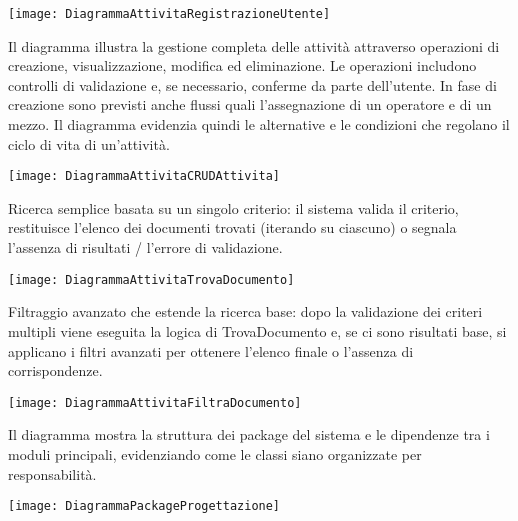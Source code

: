 \documentclass[a4paper]{report}
\begin{document}
\begin{figure*}[!ht]
    \centering
    \texttt{[image: DiagrammaAttivitaRegistrazioneUtente]}
\end{figure*}

\clearpage
{}
Il diagramma illustra la gestione completa delle attività attraverso operazioni di creazione, visualizzazione, modifica ed eliminazione. Le operazioni includono controlli di validazione e, se necessario, conferme da parte dell’utente. In fase di creazione sono previsti anche flussi quali l’assegnazione di un operatore e di un mezzo. Il diagramma evidenzia quindi le alternative e le condizioni che regolano il ciclo di vita di un’attività.

\begin{figure*}[!ht]
    \centering
    \texttt{[image: DiagrammaAttivitaCRUDAttivita]}
\end{figure*}

\clearpage
{}
Ricerca semplice basata su un singolo criterio: il sistema valida il criterio, restituisce l’elenco dei documenti trovati (iterando su ciascuno) o segnala l’assenza di risultati / l’errore di validazione.

\begin{figure*}[!ht]
    \centering
    \texttt{[image: DiagrammaAttivitaTrovaDocumento]}
\end{figure*}

\clearpage
{}
Filtraggio avanzato che estende la ricerca base: dopo la validazione dei criteri multipli viene eseguita la logica di TrovaDocumento e, se ci sono risultati base, si applicano i filtri avanzati per ottenere l’elenco finale o l’assenza di corrispondenze.

\begin{figure*}[!ht]
    \centering
    \texttt{[image: DiagrammaAttivitaFiltraDocumento]}
\end{figure*}


Il diagramma mostra la struttura dei package del sistema e le dipendenze tra i moduli principali, evidenziando come le classi siano organizzate per responsabilità.

\begin{figure*}[!ht]
    \centering
    \texttt{[image: DiagrammaPackageProgettazione]}
\end{figure*}

\clearpage
{}
\end{document}

